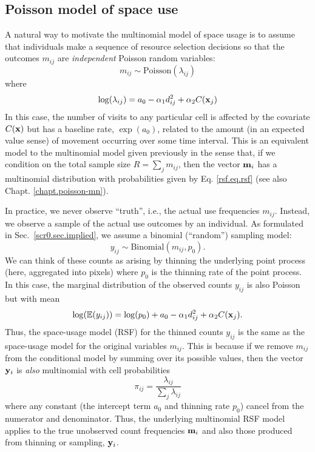 \subsection{Poisson model of space use}

A natural way to motivate the multinomial model of space usage is to
assume that individuals make a sequence of resource selection
decisions so that the outcomes $m_{ij}$ are {\it
  independent} Poisson random variables:
\[
 m_{ij} \sim \mbox{Poisson}( \lambda_{ij})
\]
where
\[
 \log(\lambda_{ij}) = a_{0} -\alpha_{1} d_{ij}^{2} +  \alpha_{2} C({\bf x}_{j})
\]
In this case, the number of visits to any particular cell is affected
by the covariate $C({\bf x})$ but has a baseline rate, $\exp(a_{0})$,
related to the amount (in an expected value sense) of movement occurring over some time interval.
This is an equivalent model to the multinomial model given previously
in the sense that, if we condition on the total sample size $R = 
\sum_{j} m_{ij}$, then the vector ${\bf m}_{i}$ has a multinomial
distribution with probabilities given by Eq. \ref{rsf.eq.rsf} (see
also Chapt. \ref{chapt.poisson-mn}).  

In practice, we never observe ``truth'', i.e., the actual use
frequencies $m_{ij}$. Instead, we observe a sample of the actual use
outcomes by an individual.  As formulated in
Sec.~\ref{scr0.sec.implied}, we assume a binomial (``random'')
sampling model:
\[
 y_{ij} \sim \mbox{Binomial}(m_{ij}, p_{0}).
\]
We can think of these counts as arising by thinning the underlying
point process (here, aggregated into pixels) where $p_{0}$ is the
thinning rate of the point process.  In this case, the marginal
distribution of the observed counts $y_{ij}$ is also Poisson but with
mean
\[
 \log(\mathbb{E}(y_{ij}))  = \log(p_{0}) + a_{0} -\alpha_{1} d_{ij}^{2} +  \alpha_{2} C({\bf x}_{j}).
\]
Thus, the space-usage model (RSF) for the thinned counts $y_{ij}$ is
the same as the space-usage model for the original variables $m_{ij}$.
This is because if we remove $m_{ij}$ from the conditional model by
summing over its possible values, then the vector ${\bf y}_{i}$ is
{\it also} multinomial with cell probabilities
\[
\pi_{ij} = \frac{\lambda_{ij}}{\sum_{j} \lambda_{ij}}
\]
where any constant (the intercept term $a_0$ and thinning rate
$p_{0}$) cancel from the numerator and denominator. Thus, the
underlying multinomial RSF model applies to the true unobserved count
frequencies ${\bf m}_{i}$ and also those produced from thinning or
sampling, ${\bf y}_{i}$.


